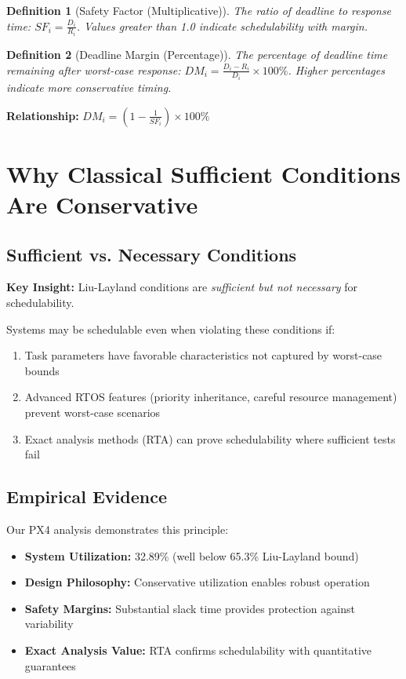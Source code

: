 \documentclass[12pt,a4paper]{article}
\newtheorem{definition}{Definition}
\begin{document}
\begin{definition}[Safety Factor (Multiplicative)]
The ratio of deadline to response time: $SF_i = \frac{D_i}{R_i}$. Values greater than 1.0 indicate schedulability with margin.
\end{definition}

\begin{definition}[Deadline Margin (Percentage)]
The percentage of deadline time remaining after worst-case response: $DM_i = \frac{D_i - R_i}{D_i} \times 100\%$. Higher percentages indicate more conservative timing.
\end{definition}

\textbf{Relationship:} $DM_i = (1 - \frac{1}{SF_i}) \times 100\%$

\section{Why Classical Sufficient Conditions Are Conservative}

\subsection{Sufficient vs. Necessary Conditions}

\textbf{Key Insight:} Liu-Layland conditions are \emph{sufficient but not necessary} for schedulability.

Systems may be schedulable even when violating these conditions if:
\begin{enumerate}
\item Task parameters have favorable characteristics not captured by worst-case bounds
\item Advanced RTOS features (priority inheritance, careful resource management) prevent worst-case scenarios
\item Exact analysis methods (RTA) can prove schedulability where sufficient tests fail
\end{enumerate}

\subsection{Empirical Evidence}

Our PX4 analysis demonstrates this principle:
\begin{itemize}
\item \textbf{System Utilization:} 32.89\% (well below 65.3\% Liu-Layland bound)
\item \textbf{Design Philosophy:} Conservative utilization enables robust operation
\item \textbf{Safety Margins:} Substantial slack time provides protection against variability
\item \textbf{Exact Analysis Value:} RTA confirms schedulability with quantitative guarantees
\end{itemize}
\end{document}
